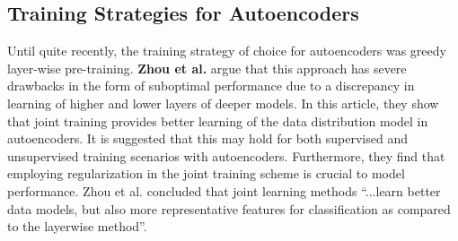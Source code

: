 \subsection{Training Strategies for Autoencoders} \label{sec:trainae}
Until quite recently, the training strategy of choice for autoencoders was greedy layer-wise pre-training. 
\textbf{Zhou et al.}\autocite{Zhou2014} argue that this approach has severe drawbacks in the form of suboptimal performance due to a discrepancy in learning of higher and lower layers of deeper models.
In this article, they show that joint training provides better learning of the data distribution model in autoencoders. 
It is suggested that this may hold for both supervised and unsupervised training scenarios with autoencoders. 
Furthermore, they find that employing regularization in the joint training scheme is crucial to model performance. 
Zhou et al. concluded that joint learning methods “...learn better data models, but also more representative features for classification as compared to the layerwise method”.




